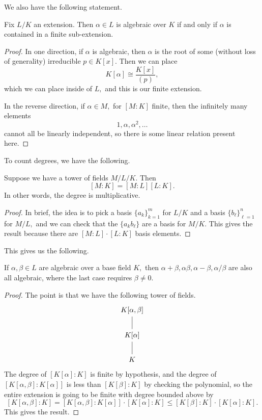 We also have the following statement.
\begin{proposition}
	Fix $L/K$ an extension. Then $\alpha\in L$ is algebraic over $K$ if and only if $\alpha$ is contained in a finite sub-extension.
\end{proposition}
\begin{proof}
	In one direction, if $\alpha$ is algebraic, then $\alpha$ is the root of some (without loss of generality) irreducible $p\in K[x].$ Then we can place
	\[K[\alpha]\cong\frac{K[x]}{(p)},\]
	which we can place inside of $L,$ and this is our finite extension.

	In the reverse direction, if $\alpha\in M,$ for $[M:K]$ finite, then the infinitely many elements
	\[1,\alpha,\alpha^2,\ldots\]
	cannot all be linearly independent, so there is some linear relation present here.
\end{proof}
To count degrees, we have the following.
\begin{proposition}
	Suppose we have a tower of fields $M/L/K.$ Then
	\[[M:K]=[M:L][L:K].\]
	In other words, the degree is multiplicative.
\end{proposition}
\begin{proof}
	In brief, the idea is to pick a basis $\{a_k\}_{k=1}^m$ for $L/K$ and a basis $\{b_\ell\}_{\ell=1}^n$ for $M/L,$ and we can check that the $\{a_kb_\ell\}$ are a basis for $M/K.$ This gives the result because there are $[M:L]\cdot[L:K]$ basis elements.
\end{proof}
This gives us the following.
\begin{proposition}
	If $\alpha,\beta\in L$ are algebraic over a base field $K,$ then $\alpha+\beta,\alpha\beta,\alpha-\beta,\alpha/\beta$ are also all algebraic, where the last case requires $\beta\ne0.$
\end{proposition}
\begin{proof}
	The point is that we have the following tower of fields.
	\[\begin{tikzcd}
		{K[\alpha,\beta]} \\
		{K[\alpha]} \\
		K
		\arrow[no head, from=1-1, to=2-1]
		\arrow[no head, from=2-1, to=3-1]
	\end{tikzcd}\]
	The degree of $[K[\alpha]:K]$ is finite by hypothesis, and the degree of $[K[\alpha,\beta]:K[\alpha]]$ is less than $[K[\beta]:K]$ by checking the polynomial, so the entire extension is going to be finite with degree bounded above by
	\[[K[\alpha,\beta]:K]=[K[\alpha,\beta]:K[\alpha]]\cdot[K[\alpha]:K]\le[K[\beta]:K]\cdot[K[\alpha]:K].\]
	This gives the result.
\end{proof}
